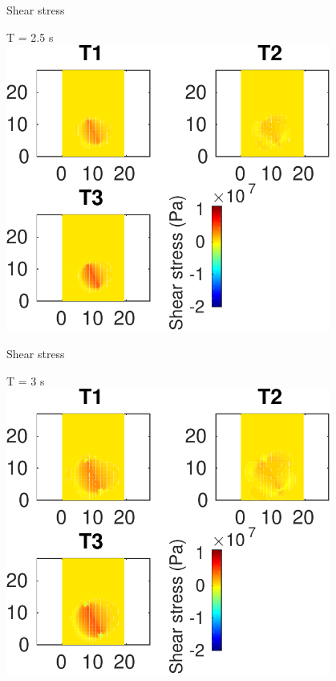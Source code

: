 \documentclass{beamer}
\begin{document}
\begin{frame}
 {Shear stress}
 
 \centering \Large T = 2.5 s\\
 \includegraphics[width=0.8\textwidth]{images/horizontal_00031}
 
\end{frame}

\begin{frame}
 {Shear stress}
 
 \centering \Large T = 3 s\\
 \includegraphics[width=0.8\textwidth]{images/horizontal_00036}
 
\end{frame}
\end{document}
